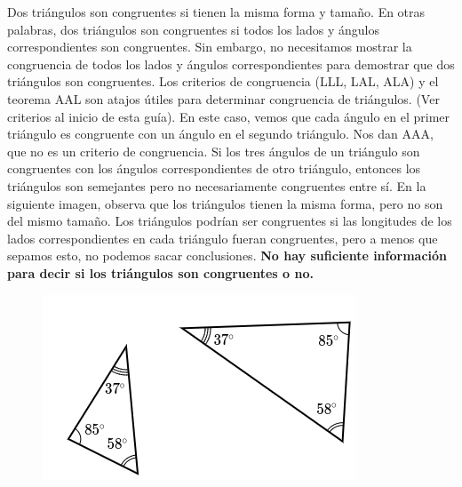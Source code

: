 \begin{solutionbox}{6cm}\footnotesize
    \begin{minipage}[t][][t]{0.6\textwidth}
        Dos triángulos son congruentes si tienen la misma forma y tamaño. En otras palabras, dos triángulos son congruentes si todos los lados y ángulos correspondientes son congruentes.
        Sin embargo, no necesitamos mostrar la congruencia de todos los lados y ángulos correspondientes para demostrar que dos triángulos son congruentes. Los criterios de congruencia (LLL, LAL, ALA) y el teorema AAL son atajos útiles para determinar congruencia de triángulos. (Ver criterios al inicio de esta guía).
        En este caso, vemos que cada ángulo en el primer triángulo es congruente con un ángulo en el segundo triángulo. Nos dan AAA, que no es un criterio de congruencia.
        Si los tres ángulos de un triángulo son congruentes con los ángulos correspondientes de otro triángulo, entonces los triángulos son semejantes pero no necesariamente congruentes entre sí. En la siguiente imagen, observa que los triángulos tienen la misma forma, pero no son del mismo tamaño.
        Los triángulos podrían ser congruentes si las longitudes de los lados correspondientes en cada triángulo fueran congruentes, pero a menos que sepamos esto, no podemos sacar conclusiones.
        \textbf{No hay suficiente información para decir si los triángulos son congruentes o no.}
    \end{minipage}\hfill
    \begin{minipage}[t][][t]{0.35\textwidth}
        \begin{figure}[H]
            \centering
            \includegraphics[width=0.8\linewidth]{../images/20230323153219}
            \caption{}
            \label{fig:20230323153219}
        \end{figure}
    \end{minipage}
\end{solutionbox}